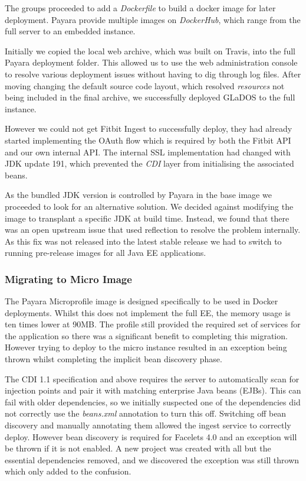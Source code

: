 \par
The groups proceeded to add a \textit{Dockerfile} to build a docker image for later deployment. Payara provide multiple images on \textit{DockerHub}\cite{DockerHub_Payara}, which range from the full server to an embedded instance.

\par
Initially we copied the local web archive, which was built on Travis, into the full Payara deployment folder. This allowed us to use the web administration console to resolve various deployment issues without having to dig through log files. After moving changing the default source code layout, which resolved \textit{resources} not being included in the final archive, we successfully deployed GLaDOS to the full instance.

\par
However we could not get Fitbit Ingest to successfully deploy, they had already started implementing the OAuth flow which is required by both the Fitbit API and our own internal API. The internal SSL implementation had changed with JDK update 191, which prevented the \textit{CDI} layer from initialising the associated beans.

\par
As the bundled JDK version is controlled by Payara in the base image we proceeded to look for an alternative solution. We decided against modifying the image to transplant a specific JDK at build time. Instead, we found that there was an open upstream issue\cite{payara_ssl_issue} that used reflection to resolve the problem internally. As this fix was not released into the latest stable release we had to switch to running pre-release images for all Java EE applications.

\subsubsection{Migrating to Micro Image}
\par
The Payara Microprofile image is designed specifically to be used in Docker deployments. Whilst this does not implement the full EE, the memory usage is ten times lower at 90MB. The profile still provided the required set of services for the application so there was a significant benefit to completing this migration. However trying to deploy to the micro instance resulted in an exception being thrown whilst completing the implicit bean discovery phase. 

\par
The CDI 1.1 specification and above requires the server to automatically scan for injection points and pair it with matching enterprise Java beans (EJBs). This can fail with older dependencies, so we initially suspected one of the dependencies did not correctly use the \textit{beans.xml} annotation to turn this off.
\newline
Switching off bean discovery and manually annotating them allowed the ingest service to correctly deploy. However bean discovery is required for Facelets 4.0 and an exception will be thrown if it is not enabled. A new project was created with all but the essential dependencies removed, and we discovered the exception was still thrown which only added to the confusion. 

